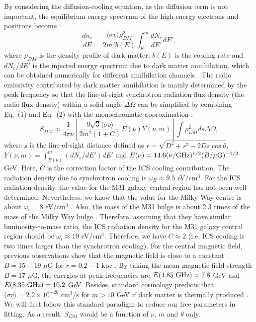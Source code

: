 \documentclass[useAMS,usenatbib]{mn2e}
\begin{document}
By considering the diffusion-cooling equation, as the diffusion term is not important, the equilibrium energy spectrum of the high-energy electrons and positrons become \citep{Borriello,Storm,Egorov}:
\begin{equation}
\frac{dn_e}{dE}= \frac{\langle \sigma v \rangle \rho_{DM}^2}{2m^2b(E)} \int_E^m \frac{dN_e}{dE'}dE',
\end{equation}
where $\rho_{DM}$ is the density profile of dark matter, $b(E)$ is the cooling rate and $dN_e/dE'$ is the injected energy spectrum due to dark matter annihilation, which can be obtained numerically for different annihilation channels \citep{Cirelli}. The radio emissivity contributed by dark matter annihilation is mainly determined by the peak frequency so that the line-of-sight synchrotron radiation flux density (the radio flux density) within a solid angle $\Delta \Omega$ can be simplified by combining Eq.~(1) and Eq.~(2) with the monochromatic approximation \citep{Bertone,Profumo}:
\begin{equation}
S_{DM} \approx \frac{1}{4 \pi \nu} \left[ \frac{9 \sqrt{3} \langle \sigma v \rangle}{2m^2(1+C)} E(\nu)Y(\nu,m) \right] \int \rho_{DM}^2ds \Delta \Omega,
\end{equation}
where $s$ is the line-of-sight distance defined as $r=\sqrt{D^2+s^2-2Ds \cos \theta}$, $Y(\nu,m)=\int_{E(\nu)}^m (dN_e/dE')dE'$ and $E(\nu)=14.6(\nu/{\rm GHz})^{1/2}(B/{\rm \mu G})^{-1/2}$ GeV. Here, $C$ is the correction factor of the ICS cooling contribution. The radiation density due to synchrotron cooling is $\omega_B \approx 9.5$ eV/cm$^3$. For the ICS radiation density, the value for the M31 galaxy central region has not been well-determined. Nevertheless, we know that the value for the Milky Way centre is about $\omega_i=8$ eV/cm$^3$ \citep{Egorov}. Also, the mass of the M31 bulge is about 2.3 times of the mass of the Milky Way bulge \citep{Blana,Karukes}. Therefore, assuming that they have similar luminosity-to-mass ratio, the ICS radiation density for the M31 galaxy central region should be $\omega_i \approx 19$ eV/cm$^3$. Therefore, we have $C \approx 2$ (i.e. ICS cooling is two times larger than the synchrotron cooling). For the central magnetic field, previous observations show that the magnetic field is close to a constant $B=15-19$ $\mu$G for $r=0.2-1$ kpc \citep{Giebubel}. By taking the mean magnetic field strength $B=17$ $\mu$G, the energies at peak frequencies are $E(4.85~\rm GHz)=7.8$ GeV and $E(8.35~\rm GHz)=10.2$ GeV. Besides, standard cosmology predicts that $\langle \sigma v \rangle=2.2 \times 10^{-26}$ cm$^3$/s for $m>10$ GeV if dark matter is thermally produced \citep{Steigman}. We will first follow this standard paradigm to reduce our free parameters in fitting. As a result, $S_{DM}$ would be a function of $\nu$, $m$ and $\theta$ only.
\end{document}
